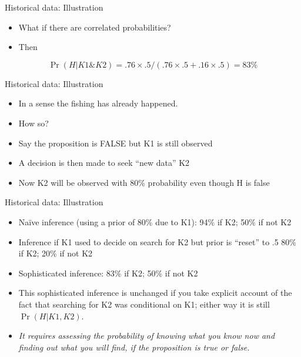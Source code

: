 \documentclass[
  11pt,
  ignorenonframetext,
]{beamer}
\begin{document}
\begin{frame}{Historical data: Illustration}
\protect\hypertarget{historical-data-illustration-3}{}
\begin{itemize}
\item
  What if there are correlated probabilities?
\item
  Then
\end{itemize}

\[\Pr(H | K1 \& K2) = .76 \times .5/(.76 \times .5 + .16 \times .5) = 83\%\]
\end{frame}

\begin{frame}{Historical data: Illustration}
\protect\hypertarget{historical-data-illustration-4}{}
\begin{itemize}
\item
  In a sense the fishing has already happened.
\item
  How so?
\item
  Say the proposition is FALSE but K1 is still observed
\item
  A decision is then made to seek ``new data'' K2
\item
  Now K2 will be observed with 80\% probability even though H is false
\end{itemize}
\end{frame}

\begin{frame}{Historical data: Illustration}
\protect\hypertarget{historical-data-illustration-5}{}
\begin{itemize}
\item
  Naïve inference (using a prior of 80\% due to K1): 94\% if K2; 50\% if
  not K2
\item
  Inference if K1 used to decide on search for K2 but prior is ``reset''
  to .5 80\% if K2; 20\% if not K2
\item
  Sophisticated inference: 83\% if K2; 50\% if not K2
\item
  This sophisticated inference is unchanged if you take explicit account
  of the fact that searching for K2 was conditional on K1; either way it
  is still \(\Pr(H | K1, K2)\).
\item
  \emph{It requires assessing the probability of knowing what you know
  now and finding out what you will find, if the proposition is true or
  false.}
\end{itemize}
\end{frame}
\end{document}
